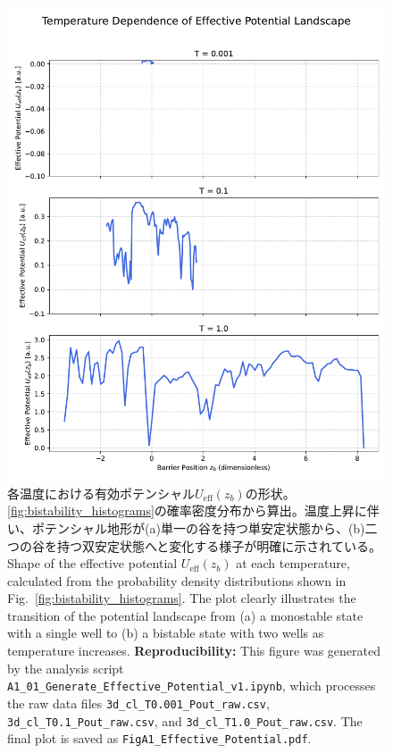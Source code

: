 \documentclass[a4paper,11pt,ja=standard,lualatex]{bxjsarticle}
\newcommand{\figref}[1]{\cref{#1}}
\begin{document}
\begin{figure}[htbp]
    \centering
    \includegraphics[width=0.7\linewidth]{FigA1_Effective_Potential.pdf}
    \caption{各温度における有効ポテンシャル$U_{\mathrm{eff}}(z_b)$の形状。\figref{fig:bistability_histograms}の確率密度分布から算出。温度上昇に伴い、ポテンシャル地形が(a)単一の谷を持つ単安定状態から、(b)二つの谷を持つ\mbox{双安定}状態へと変化する様子が明確に示されている。
    \newline\newline
    Shape of the effective potential $U_{\mathrm{eff}}(z_b)$ at each temperature, calculated from the probability density distributions shown in Fig.~\ref{fig:bistability_histograms}. The plot clearly illustrates the transition of the potential landscape from (a) a monostable state with a single well to (b) a bistable state with two wells as temperature increases.
    \newline\newline
    \textbf{Reproducibility:} This figure was generated by the analysis script \texttt{A1\_01\_Generate\_Effective\_Potential\_v1.ipynb}, which processes the raw data files \texttt{3d\_cl\_T0.001\_Pout\_raw.csv}, \texttt{3d\_cl\_T0.1\_Pout\_raw.csv}, and \texttt{3d\_cl\_T1.0\_Pout\_raw.csv}. The final plot is saved as \texttt{FigA1\_Effective\_Potential.pdf}.
    }
    \label{fig:effective_potential}
\end{figure}

\FloatBarrier
\end{document}
